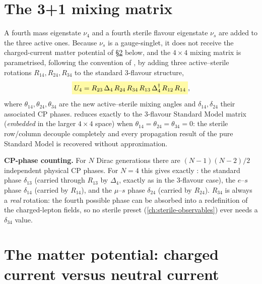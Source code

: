 \section{The 3+1 mixing matrix}

\begin{theorybox}
A fourth mass eigenstate $\nu_4$ and a fourth sterile flavour eigenstate
$\nu_s$ are added to the three active ones. Because $\nu_s$ is a
gauge-singlet, it does not receive the charged-current matter potential of
\S\ref{sec:sterile-matter} below, and the $4\times4$ mixing matrix is
parametrised, following the convention of
\textcite{KoppMachadoMaltoniSchwetz2013}, by adding three active--sterile
rotations $R_{14},R_{24},R_{34}$ to the standard 3-flavour structure,
\begin{equation}
  \keyresult{U_4 = R_{23}\,\Delta_4\,R_{24}\,R_{34}\,R_{13}\,\Delta_4^\dagger\,R_{12}\,R_{14}},
  \label{eq:u4}
\end{equation}
where $\theta_{14},\theta_{24},\theta_{34}$ are the new active--sterile
mixing angles and $\delta_{14},\delta_{24}$ their associated CP phases.
 reduces exactly to the 3-flavour Standard Model matrix
(\emph{embedded} in the larger $4\times4$ space) when
$\theta_{14}=\theta_{24}=\theta_{34}=0$: the sterile row/column decouple
completely and every propagation result of the pure Standard Model is
recovered without approximation.
\end{theorybox}

\begin{notebox}
\textbf{CP-phase counting.} For $N$ Dirac generations there are
$(N-1)(N-2)/2$ independent physical CP phases. For $N=4$ this gives exactly
: the standard phase $\delta_{13}$ (carried through
$R_{13}$ by $\Delta_4$, exactly as in the 3-flavour case), the $e$--$s$
phase $\delta_{14}$ (carried by $R_{14}$), and the $\mu$--$s$ phase
$\delta_{24}$ (carried by $R_{24}$). $R_{34}$ is always a \emph{real}
rotation: the fourth possible phase can be absorbed into a redefinition of
the charged-lepton fields, so no sterile preset (\cref{ch:sterile-observables})
ever needs a $\delta_{34}$ value.
\end{notebox}

\section{The matter potential: charged current versus neutral current}
\label{sec:sterile-matter}

